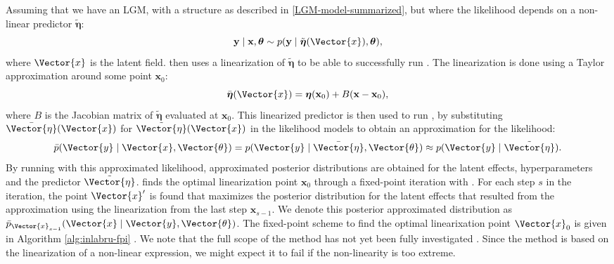 \newpar Assuming that we have an LGM, with a structure as described in \ref{LGM-model-summarized}, but where the likelihood depends on a non-linear predictor $\tilde{\boldsymbol{\eta}}$:
\begin{equation}
    \textbf{y}\mid\textbf{x},\boldsymbol{\theta} \sim p(\textbf{y}\mid \tilde{\boldsymbol{\eta}}(\Vector{x}), \boldsymbol{\theta}),
    \label{Eq:non-linear-predictor}
\end{equation}
where $\Vector{x}$ is the latent field. 
\inlabru then uses a linearization of $\tilde{\boldsymbol{\eta}}$ to be able to successfully run \inla. The linearization is done using a Taylor approximation around some point $\textbf{x}_0$:
\begin{equation}
    \bar{\boldsymbol{\eta}}(\Vector{x}) = \boldsymbol{\eta}(\textbf{x}_0) + B(\textbf{x} - \textbf{x}_0),
\end{equation}
where $B$ is the Jacobian matrix of $\tilde{\boldsymbol{\eta}}$ evaluated at $\textbf{x}_0$. This linearized predictor is then used to run \inla, by substituting $\bar{\Vector{\eta}}(\Vector{x})$ for $\tilde{\Vector{\eta}}(\Vector{x})$ in the likelihood models to obtain an approximation for the likelihood:
\begin{equation}
    \bar{p}(\Vector{y}\mid \Vector{x}, \Vector{\theta}) = p(\Vector{y}\mid \bar{\Vector{\eta}}, \Vector{\theta}) \approx p(\Vector{y} \mid \tilde{\Vector{\eta}}).
\end{equation}
By running \inla with this approximated likelihood, approximated posterior distributions are obtained for the latent effects, hyperparameters and the predictor $\tilde{\Vector{\eta}}$.
\inlabru finds the optimal linearization point $\textbf{x}_0$ through a fixed-point iteration with \inla. For each step $s$ in the iteration, the point $\Vector{x}'$ is found that maximizes the posterior distribution for the latent effects that resulted from the \inla approximation using the linearization from the last step $\textbf{x}_{s-1}$. We denote this posterior approximated distribution as $\bar{p}_{\Vector{x}_{s-1}}(\Vector{x}\mid \Vector{y}, \Vector{\theta})$. The fixed-point scheme to find the optimal linearixation point $\Vector{x}_0$ is given in Algorithm \ref{alg:inlabru-fpi} \parencite{Inlabru}. We note that the full scope of the \inlabru method has not yet been fully investigated \parencite{Inlabru}. Since the method is based on the linearization of a non-linear expression, we might expect it to fail if the non-linearity is too extreme. 
